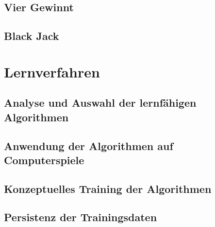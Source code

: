 \subsection{Vier Gewinnt}

\subsection{Black Jack}




\section{Lernverfahren}
\label{sec:lernverfahren}

\subsection{Analyse und Auswahl der lernfähigen Algorithmen}

\subsection{Anwendung der Algorithmen auf Computerspiele}

\subsection{Konzeptuelles Training der Algorithmen}

\subsection{Persistenz der Trainingsdaten}